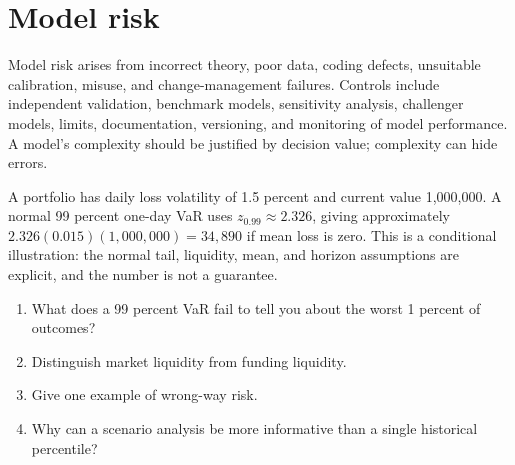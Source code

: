 \section{Model risk}
Model risk arises from incorrect theory, poor data, coding defects, unsuitable calibration, misuse, and change-management failures. Controls include independent validation, benchmark models, sensitivity analysis, challenger models, limits, documentation, versioning, and monitoring of model performance. A model's complexity should be justified by decision value; complexity can hide errors.

\begin{worked}
A portfolio has daily loss volatility of 1.5 percent and current value 1,000,000. A normal 99 percent one-day VaR uses $z_{0.99}\approx2.326$, giving approximately $2.326(0.015)(1,000,000)=34,890$ if mean loss is zero. This is a conditional illustration: the normal tail, liquidity, mean, and horizon assumptions are explicit, and the number is not a guarantee.
\end{worked}

\begin{exerciseblock}
\begin{enumerate}
  \item What does a 99 percent VaR fail to tell you about the worst 1 percent of outcomes?
  \item Distinguish market liquidity from funding liquidity.
  \item Give one example of wrong-way risk.
  \item Why can a scenario analysis be more informative than a single historical percentile?
\end{enumerate}
\end{exerciseblock}

